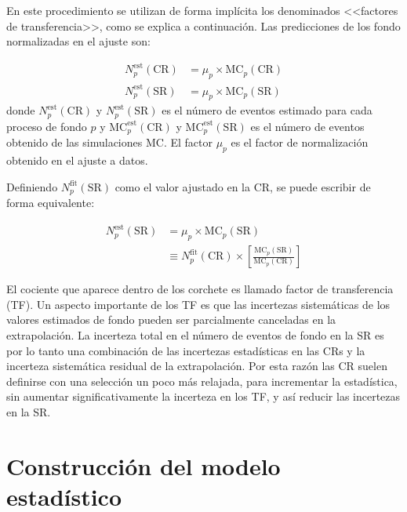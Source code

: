 En este procedimiento se utilizan de forma implícita los
denominados <<factores de transferencia>>, como se explica a continuación.
Las predicciones de los fondo normalizadas en el ajuste son:

\begin{align}
  N_p^{\text{est}}(\text{CR}) &= \mu_p \times \text{MC}_p (\text{CR})
  \\ N_p^{\text{est}}(\text{SR}) &= \mu_p \times \text{MC}_p (\text{SR})
\end{align}
%
donde $N_p^{\text{est}}(\text{CR})$ y $N_p^{\text{est}}(\text{SR})$ es el número
de eventos estimado para cada proceso de fondo $p$ y
$\text{MC}_p^{\text{est}}(\text{CR})$ y $\text{MC}_p^{\text{est}}(\text{SR})$ es
el número de eventos obtenido de las simulaciones MC. El factor $\mu_p$ es el
factor de normalización obtenido en el ajuste a datos.

Definiendo $N_p^\text{fit}(\text{SR})$ como el valor ajustado en la CR, se puede
escribir de forma equivalente:

\begin{align}
  N_p^\text{est}(\text{SR}) &= \mu_p \times \text{MC}_p (\text{SR}) \nonumber \\
  &\equiv N_p^\text{fit}(\text{CR}) \times \left[ \frac{\text{MC}_p(\text{SR})}{\text{MC}_p(\text{CR})} \right]
\end{align}

El cociente que aparece dentro de los corchete es llamado factor de
transferencia (TF). Un aspecto importante de los TF es que las incertezas
sistemáticas de los valores estimados de fondo pueden ser parcialmente
canceladas en la extrapolación. La incerteza total en el número de eventos de
fondo en la SR es por lo tanto una combinación de las incertezas estadísticas en
las CRs y la incerteza sistemática residual de la extrapolación. Por esta razón
las CR suelen definirse con una selección un poco más relajada, para incrementar
la estadística, sin aumentar significativamente la incerteza en los TF, y así
reducir las incertezas en la SR.


\section{Construcción del modelo estadístico}


